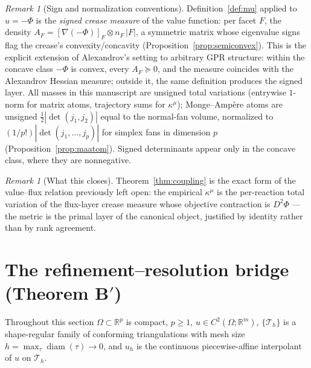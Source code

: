 \documentclass[11pt,a4paper]{article}
\theoremstyle{plain}
\theoremstyle{definition}
\theoremstyle{remark}
\newtheorem{remark}[theorem]{Remark}
\newcommand{\kmu}{\kappa^{\mu}}
\newcommand{\RR}{\mathbb{R}}
\begin{document}
\begin{remark}[Sign and normalization conventions]\label{rem:conventions}
Definition~\ref{def:mu} applied to $u = -\Phi$ is the \emph{signed
crease measure} of the value function: per facet $F$, the density
$A_F = [\nabla(-\Phi)]_F \otimes n_F\,|F|$, a symmetric matrix whose
eigenvalue signs flag the crease's convexity/concavity
(Proposition~\ref{prop:semiconvex}). This is the explicit extension
of Alexandrov's setting to arbitrary GPR structure: within the
concave class $-\Phi$ is convex, every $A_F \succeq 0$, and the
measure coincides with the Alexandrov Hessian measure; outside it,
the same definition produces the signed layer. All masses in this
manuscript are unsigned total variations (entrywise $1$-norm for
matrix atoms, trajectory sums for $\kmu$); Monge--Amp\`ere atoms are
unsigned $\tfrac12|\det(j_1, j_2)|$ equal to the normal-fan volume,
normalized to $(1/p!)|\det(j_1,\dots,j_p)|$ for simplex fans in
dimension $p$ (Proposition~\ref{prop:maatom}). Signed determinants
appear only in the concave class, where they are nonnegative.
\end{remark}

\begin{remark}[What this closes]\label{rem:closes}
Theorem~\ref{thm:coupling} is the exact form of the value--flux
relation previously left open: the empirical $\kmu$ is the
per-reaction total variation of the flux-layer crease measure whose
objective contraction is $D^2\Phi$ --- the metric is the primal
layer of the canonical object, justified by identity rather than by
rank agreement.
\end{remark}

\section{The refinement--resolution bridge (Theorem B$'$)}
\label{sec:theoremB}

Throughout this section $\Omega \subset \RR^p$ is compact, $p \ge 1$,
$u \in C^2(\Omega; \RR^m)$, $\{\mathcal{T}_h\}$ is a shape-regular family
of conforming triangulations with mesh size
$h = \max_\tau \operatorname{diam}(\tau) \to 0$, and $u_h$ is the
continuous piecewise-affine interpolant of $u$ on $\mathcal{T}_h$.
\end{document}
